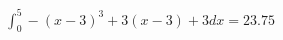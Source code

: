 \documentclass[preview]{standalone}
\begin{document}
\begin{align*}
\int_0^5 -(x-3)^3 + 3(x-3) + 3 dx = 23.75
\end{align*}
\end{document}
